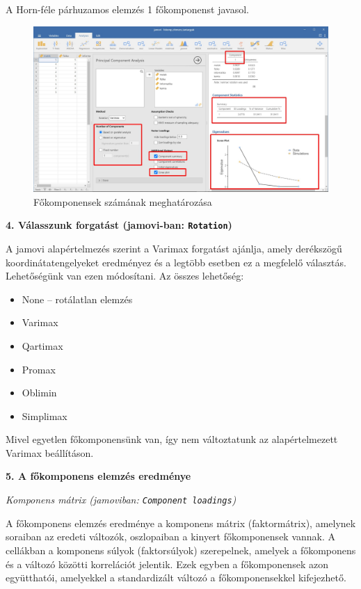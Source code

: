 \documentclass[
  letterpaper,
]{krantz}
\providecommand{\tightlist}{%
  \setlength{\itemsep}{0pt}\setlength{\parskip}{0pt}}\usepackage{longtable,booktabs,array}
\begin{document}
A Horn-féle párhuzamos elemzés 1 főkomponenst javasol.

\begin{figure}

{\centering \includegraphics{./images/fokomponens_kep_03.jpg}

}

\caption{Főkomponensek számának meghatározása}

\end{figure}

\textbf{4. Válasszunk forgatást (jamovi-ban: \texttt{Rotation})}

A jamovi alapértelmezés szerint a Varimax forgatást ajánlja, amely
derékszögű koordinátatengelyeket eredményez és a legtöbb esetben ez a
megfelelő választás. Lehetőségünk van ezen módosítani. Az összes
lehetőség:

\begin{itemize}
\tightlist
\item
  None -- rotálatlan elemzés
\item
  Varimax
\item
  Qartimax
\item
  Promax
\item
  Oblimin
\item
  Simplimax
\end{itemize}

Mivel egyetlen főkomponensünk van, így nem változtatunk az
alapértelmezett Varimax beállításon.

\textbf{5. A főkomponens elemzés eredménye}

\emph{Komponens mátrix (jamoviban: \texttt{Component\ loadings})}

A főkomponens elemzés eredménye a komponens mátrix (faktormátrix),
amelynek soraiban az eredeti változók, oszlopaiban a kinyert
főkomponensek vannak. A cellákban a komponens súlyok (faktorsúlyok)
szerepelnek, amelyek a főkomponens és a változó közötti korrelációt
jelentik. Ezek egyben a főkomponensek azon együtthatói, amelyekkel a
standardizált változó a főkomponensekkel kifejezhető.
\end{document}
